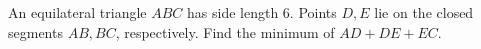 An equilateral triangle $ABC$ has side length 6. Points $D,E$ lie on the closed segments $AB,BC$, respectively. Find the minimum of $AD+DE+EC$.
